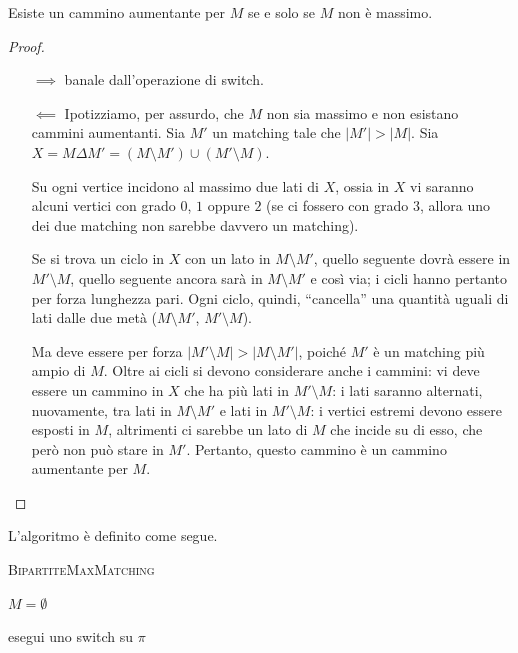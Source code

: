 \begin{theorem}
	Esiste un cammino aumentante per $M$ se e solo se $M$ non è massimo.
\end{theorem}
\begin{proof}

	\begin{itemize}
		\item[$\implies$] banale dall'operazione di switch.

		\item[$\impliedby$] Ipotizziamo, per assurdo, che $M$ non sia massimo
			e non esistano cammini aumentanti. Sia $M'$ un matching tale che $|M'| > |M|$.
			Sia $X = M\Delta M' = (M \setminus M') \cup (M' \setminus M)$.

			Su ogni vertice incidono al massimo due lati di $X$, ossia
			in $X$ vi saranno alcuni vertici con grado $0$, $1$ oppure $2$
			(se ci fossero con grado $3$, allora uno dei due matching non sarebbe
			davvero un matching).

			Se si trova un ciclo in $X$ con un lato in $M \setminus M'$, quello seguente
			dovrà essere in $M' \setminus M$, quello seguente ancora sarà in $M \setminus M'$
			e così via; i cicli hanno pertanto per forza lunghezza pari.
			Ogni ciclo, quindi, ``cancella'' una quantità uguali di lati dalle due metà
			($M \setminus M'$, $M' \setminus M$).

			Ma deve essere per forza $|M' \setminus M| > |M \setminus M'|$,  poiché
			$M'$ è un matching più ampio di $M$. Oltre ai cicli si devono considerare
			anche i cammini: vi deve essere un cammino in $X$ che ha più lati in $M' \setminus M$:
			i lati saranno alternati, nuovamente, tra lati in $M\setminus M'$ e lati in
			$M' \setminus M$: i vertici estremi devono essere esposti in $M$,
			altrimenti ci sarebbe un lato di $M$ che incide su di esso, che però non può stare in $M'$.
			Pertanto, questo cammino è un cammino aumentante per $M$.
	\end{itemize}
\end{proof}

\noindent
L'algoritmo è definito come segue.

\begin{algorithm}[!ht]
	\caption{\textsc{BipartiteMaxMatching}}

	$ M = \emptyset $

	{
		esegui uno switch su $\pi$
	}
\end{algorithm}

